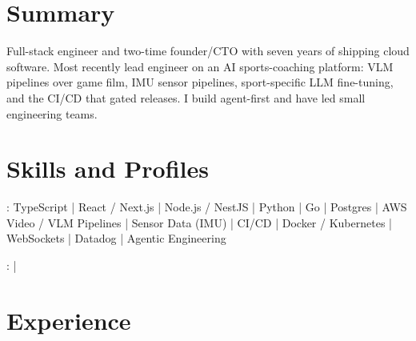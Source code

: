 \documentclass[print]{jack-resume}
\begin{document}
\pagecolor{darkmodeBackground}


\begin{minipage}[t][1cm][t]{.03\textwidth}
    \hfill
\end{minipage}

\section{Summary}
Full-stack engineer and two-time founder/CTO with seven years of shipping cloud software. Most recently lead engineer on an AI sports-coaching platform: VLM pipelines over game film, IMU sensor pipelines, sport-specific LLM fine-tuning, and the CI/CD that gated releases. I build agent-first and have led small engineering teams.
\sectionsep

\section{Skills and Profiles}
:
TypeScript \hfill | \hfill
React / Next.js \hfill | \hfill
Node.js / NestJS \hfill | \hfill
Python \hfill | \hfill
Go \hfill | \hfill
Postgres \hfill | \hfill
AWS \\
\hspace{1.0cm} Video / VLM Pipelines \hfill | \hfill
Sensor Data (IMU) \hfill | \hfill
CI/CD \hfill | \hfill
Docker / Kubernetes \hfill | \hfill
WebSockets \hfill | \hfill
Datadog \hfill | \hfill
Agentic Engineering \\

\raggedright{
    :
      \href{https://www.linkedin.com/in/jack-sturtevant/}{ \ExternalLink} |
     \href{https://github.com/jacksturt}{ \ExternalLink}}

\section{Experience}
\end{document}
